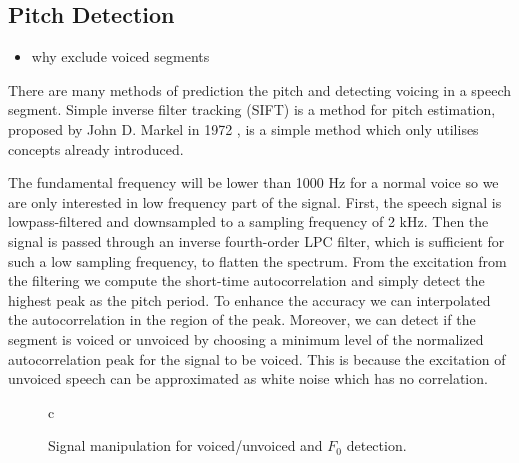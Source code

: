 \subsection{Pitch Detection} %
\label{sub:pitch_detection}
\begin{itemize}
	\item why exclude voiced segments
\end{itemize}
There are many methods of prediction the pitch and detecting voicing in a speech segment. Simple inverse filter tracking (SIFT) is a method for pitch estimation, proposed by John D. Markel in 1972 \cite{markel72}, is a simple method which only utilises concepts already introduced. 

The fundamental frequency will be lower than 1000 Hz for a normal voice so we are only interested in low frequency part of the signal. First, the speech signal is lowpass-filtered and downsampled to a sampling frequency of 2 kHz. Then the signal is passed through an inverse fourth-order LPC filter, which is sufficient for such a low sampling frequency, to flatten the spectrum. From the excitation from the filtering we compute the short-time autocorrelation and simply detect the highest peak as the pitch period. To enhance the accuracy we can interpolated the autocorrelation in the region of the peak. Moreover, we can detect if the segment is voiced or unvoiced by choosing a minimum level of the normalized autocorrelation peak for the signal to be voiced. This is because the excitation of unvoiced speech can be approximated as white noise which has no correlation.
\begin{figure}[htbp]
  \centering
  \begin{tabular}[h]{c}
  \end{tabular}
  \caption{Signal manipulation for voiced/unvoiced and $F_0$ detection.}
  \label{fig:mfcc}
\end{figure}


